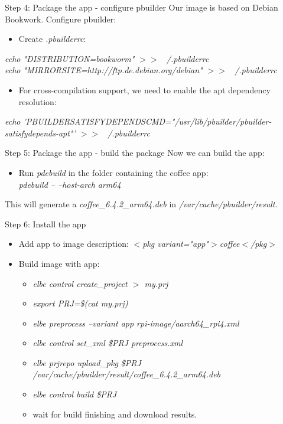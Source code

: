 \documentclass{beamer}
\begin{document}
\begin{frame}{Step 4: Package the app - configure pbuilder}
	Our image is based on Debian Bookwork. Configure pbuilder:
	\begin{itemize}
		\item Create \emph{.pbuilderrc}:
	\end{itemize}
	
	\small{\emph{echo "DISTRIBUTION=bookworm" $>>$ ~/.pbuilderrc} \\
	\emph{echo "MIRRORSITE=http://ftp.de.debian.org/debian" $>>$ ~/.pbuilderrc}}
	
	\begin{itemize}
		\item For cross-compilation support, we need to enable the apt dependency resolution:
	\end{itemize}
	\small{\emph{echo 'PBUILDERSATISFYDEPENDSCMD="/usr/lib/pbuilder/pbuilder-satisfydepends-apt"' $>>$ ~/.pbuilderrc}}
\end{frame}

\begin{frame}{Step 5: Package the app - build the package}
	Now we can build the app:
	\begin{itemize}
		\item Run \emph{pdebuild} in the folder containing the coffee app: \\ \emph{pdebuild -- --host-arch arm64}
	\end{itemize}
	This will generate a \emph{coffee\_6.4.2\_arm64.deb} in \emph{/var/cache/pbuilder/result}.
\end{frame}

\begin{frame}{Step 6: Install the app}
	\begin{itemize}
		\item Add app to image description: \emph{$<$pkg variant="app"$>$coffee$<$/pkg$>$}
		\item Build image with app:
		\small{\begin{itemize}
			\item \emph{elbe control create\_project $>$ my.prj}
			\item \emph{export PRJ=\$(cat my.prj)}
			\item \emph{elbe preprocess --variant app rpi-image/aarch64\_rpi4.xml}
			\item \emph{elbe control set\_xml \$PRJ preprocess.xml}
			\item \emph{elbe prjrepo upload\_pkg \$PRJ /var/cache/pbuilder/result/coffee\_6.4.2\_arm64.deb}
			\item \emph{elbe control build \$PRJ}
			\item wait for build finishing and download results.
		\end{itemize}}
	\end{itemize}
\end{frame}
\end{document}
